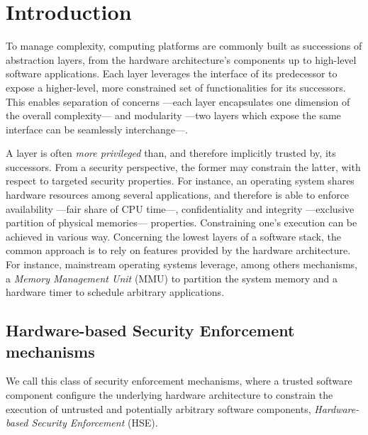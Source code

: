 \chapter{Introduction}


\vspace{1cm}\noindent To manage complexity, computing platforms are commonly
built as successions of abstraction layers, from the hardware architecture's
components up to high-level software applications.
%
Each layer leverages the interface of its predecessor to expose a higher-level,
more constrained set of functionalities for its successors.
%
This enables separation of concerns ---each layer encapsulates one dimension of
the overall complexity--- and modularity ---two layers which expose the same
interface can be seamlessly interchange---.

A layer is often \emph{more privileged} than, and therefore implicitly trusted
by, its successors.
%
From a security perspective, the former may constrain the latter, with respect
to targeted security properties.
%
For instance, an operating system shares hardware resources among several
applications, and therefore is able to enforce availability ---fair share of CPU
time---, confidentiality and integrity ---exclusive partition of physical
memories--- properties.
%
Constraining one's execution can be achieved in various way.
%
Concerning the lowest layers of a software stack, the common approach is to rely
on features provided by the hardware architecture.
%
For instance, mainstream operating systems leverage, among others mechanisms, a
\emph{Memory Management Unit} (MMU) to partition the system memory and a
hardware timer to schedule arbitrary applications.

\section{Hardware-based Security Enforcement mechanisms}

We call this class of security enforcement mechanisms, where a trusted software
component configure the underlying hardware architecture to constrain the
execution of untrusted and potentially arbitrary software components,
\emph{Hardware-based Security Enforcement} (HSE).

